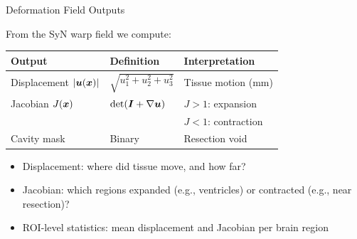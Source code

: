 \begin{frame}{Deformation Field Outputs}

  From the SyN warp field we compute:

  \bigskip

  \begin{tabular}{lll}
    \toprule
    \textbf{Output} & \textbf{Definition} & \textbf{Interpretation} \\
    \midrule
    Displacement $|\bm{u}(\bm{x})|$ &
      $\sqrt{u_1^2 + u_2^2 + u_3^2}$ &
      Tissue motion (mm) \\[4pt]
    Jacobian $J(\bm{x})$ &
      $\det(\bm{I} + \nabla\bm{u})$ &
      $J > 1$: expansion \\
    & & $J < 1$: contraction \\[4pt]
    Cavity mask & Binary &
      Resection void \\
    \bottomrule
  \end{tabular}

  \bigskip

  \begin{itemize}
    \item Displacement: where did tissue move, and how far?
    \item Jacobian: which regions expanded (e.g., ventricles) or
      contracted (e.g., near resection)?
    \item ROI-level statistics: mean displacement and Jacobian
      per brain region
  \end{itemize}

\end{frame}


